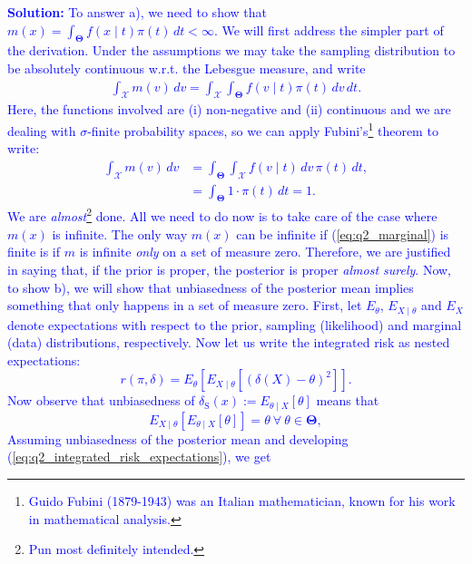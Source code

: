 \documentclass[a4paper,10pt, notitlepage]{report}
\begin{document}
\textcolor{blue}{
\textbf{Solution:}
To answer a), we need to show that $m(x) = \int_{\boldsymbol{\Theta}} f(x \mid t) \pi(t)\,dt < \infty$.
We will first address the simpler part of the derivation.
Under the assumptions we may take the sampling distribution to be absolutely continuous w.r.t. the Lebesgue measure, and write 
\begin{align*}
 \int_{\mathcal{X}} m(v)\,dv = \int_{\mathcal{X}}\int_{\boldsymbol{\Theta}} f(v\mid t)\pi(t) \, dv \,dt.
\end{align*}
Here, the functions involved are (i) non-negative and (ii) continuous and we are dealing with $\sigma$-finite probability spaces, so we can apply Fubini's\footnote{\textcolor{blue}{Guido Fubini (1879-1943) was an Italian mathematician, known for his work in mathematical analysis.}} theorem to write:
\begin{align}
\label{eq:q2_marginal}
\int_{\mathcal{X}} m(v)\,dv &= \int_{\boldsymbol{\Theta}}\int_{\mathcal{X}} f(v\mid t) \, dv \, \pi(t) \,dt,\\
\nonumber
 &= \int_{\boldsymbol{\Theta}} 1 \cdot\pi(t) \,dt = 1. 
\end{align}
We are \textit{almost}\footnote{\textcolor{blue}{Pun most definitely intended.}} done.
All we need to do now is to take care of the case where $m(x)$ is infinite.
The only way $m(x)$ can be infinite if (\ref{eq:q2_marginal}) is finite is if $m$ is infinite \textit{only} on a set of measure zero.
Therefore, we are justified in saying that, if the prior is proper, the posterior is proper \textit{almost surely}.
Now, to show b), we will show that unbiasedness of the posterior mean implies something that only happens in a set of measure zero.
First, let $E_\theta$, $E_{X \mid \theta}$ and $E_X$ denote expectations with respect to the prior, sampling (likelihood) and marginal (data) distributions, respectively.
Now let us write the integrated risk as nested expectations:
\begin{equation}
\label{eq:q2_integrated_risk_expectations}
 r(\pi, \delta) = E_\theta \left[E_{X \mid \theta} \left[ \left(\delta(X) - \theta \right)^2\right]\right].
\end{equation}
Now observe that unbiasedness of $\delta_{\text{S}}(x) := E_{\theta \mid X} \left[\theta\right]$ means that
\begin{equation*}
 E_{X \mid \theta}\left[ E_{\theta \mid X} \left[\theta\right] \right] = \theta \: \forall\: \theta \in \boldsymbol{\Theta},
\end{equation*}
Assuming unbiasedness of the posterior mean  and developing (\ref{eq:q2_integrated_risk_expectations}), we get
}
\end{document}
